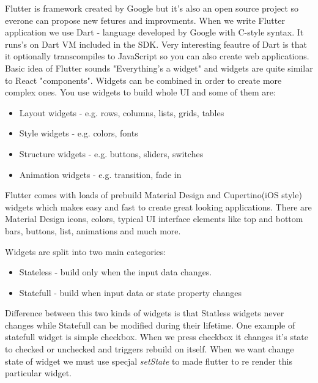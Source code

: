 \documentclass[../Main.tex]{subfiles}
\begin{document}
        Flutter is framework created by Google but it's also an open source project 
        so everone can propose new fetures and improvments. 
        When we write Flutter application we use Dart - language developed by 
        Google with C-style syntax.
        It runs's on Dart VM included in the SDK. 
        Very interesting feautre of Dart is that it optionally transcompiles to 
        JavaScript so you can also create web applications.
        Basic idea of Flutter sounds "Everything’s a widget" and widgets are 
        quite similar to React "components". 
        Widgets can be combined in order to create more complex ones. 
        You use widgets to build whole UI and some of them are:
        \begin{itemize}
            \item Layout widgets - e.g. rows, columns, lists, grids, tables
            \item Style widgets - e.g. colors, fonts
            \item Structure widgets - e.g. buttons, sliders, switches
            \item Animation widgets - e.g. transition, fade in
        \end{itemize}
        Flutter comes with loads of prebuild Material Design and Cupertino(iOS style)
        widgets which makes easy and fast to create great looking applications. 
        There are Material Design icons, colors, typical UI interface 
        elements like top and bottom bars, buttons, list, animations and much more.
        
        
        Widgets are split into two main categories:
        \begin{itemize}
             \item Stateless - build only when the input data changes. 
             \item Statefull - build when input data or state property changes 
        \end{itemize}
        
        Difference between this two kinds of widgets is that Statless widgets 
        never changes while Statefull can be modified during their lifetime.
        One example of statefull widget is simple checkbox. When we press checkbox
        it changes it's state to checked or unchecked and triggers rebuild on itself.
        When we want change state of widget we must use specjal 
        \textit{setState} to made flutter to re render this particular widget.
    
\end{document}
